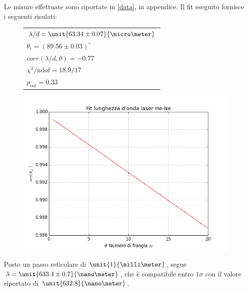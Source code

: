 Le misure effettuate sono riportate in \tablename{ \ref{data}}, in appendice. Il fit eseguito fornisce i seguenti risulati:
\begin{figure}[H]
	\begin{minipage}{0.25\textwidth}
		\begin{tabular}{l}
			$\lambda/d = \unit{63.34 \pm 0.07}{\micro\meter}$ \\
			$\theta_i = (89.56 \pm 0.03) ^\circ $\\
			$corr(\lambda/d,\theta) = -0.77$\\
			$\chi^2 /\text{ndof} = 18.9 / 17 $\\
			$p_{val} = 0.33$
		\end{tabular}
	\end{minipage}
	\begin{minipage}{0.8\textwidth}
		\centering
		\includegraphics[width=\textwidth]{./pictures/fit_He-ne.png}
	\end{minipage}
\end{figure}

Posto un passo reticolare di $\unit{1}{\milli\meter}$, segue $\lambda = \unit{633.4 \pm 0.7}{\nano\meter}$, che è compatibile entro $1 \sigma$ con il valore riportato di $\unit{632.8}{\nano\meter}$.